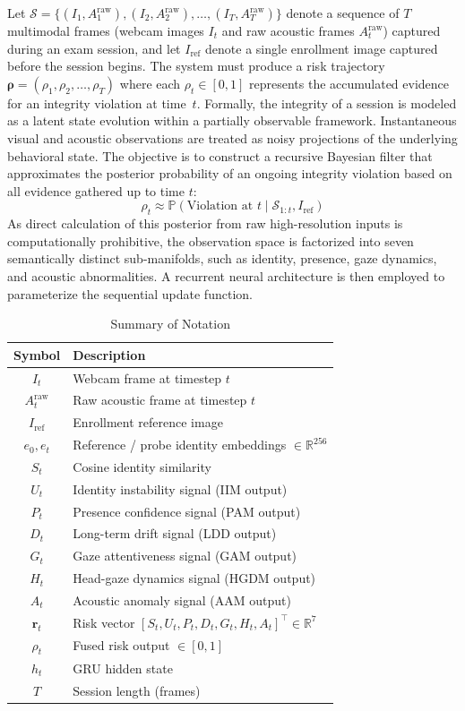 \documentclass[journal]{IEEEtran}
\begin{document}
Let $\mathcal{S} = \{(I_1, A_1^{\mathrm{raw}}), (I_2, A_2^{\mathrm{raw}}), \ldots, (I_T, A_T^{\mathrm{raw}})\}$ denote a sequence of $T$ multimodal frames (webcam images $I_t$ and raw acoustic frames $A_t^{\mathrm{raw}}$) captured during an exam session, and let $I_{\mathrm{ref}}$ denote a single enrollment image captured before the session begins. The system must produce a risk trajectory $\bm{\rho} = (\rho_1, \rho_2, \ldots, \rho_T)$ where each $\rho_t \in [0,1]$ represents the accumulated evidence for an integrity violation at time~$t$. Formally, the integrity of a session is modeled as a latent state evolution within a partially observable framework. Instantaneous visual and acoustic observations are treated as noisy projections of the underlying behavioral state. The objective is to construct a recursive Bayesian filter that approximates the posterior probability of an ongoing integrity violation based on all evidence gathered up to time $t$:
\begin{equation}
    \rho_t \approx \mathbb{P}(\text{Violation at } t \mid \mathcal{S}_{1:t}, I_{\mathrm{ref}})
\end{equation}
As direct calculation of this posterior from raw high-resolution inputs is computationally prohibitive, the observation space is factorized into seven semantically distinct sub-manifolds, such as identity, presence, gaze dynamics, and acoustic abnormalities. A recurrent neural architecture is then employed to parameterize the sequential update function.

\begin{table}[!ht]
\caption{Summary of Notation}
\label{tab:notation}
\centering
\footnotesize
\begin{tabular}{cl}
\toprule
\textbf{Symbol} & \textbf{Description} \\
\midrule
$I_t$ & Webcam frame at timestep $t$ \\
$A_t^{\mathrm{raw}}$ & Raw acoustic frame at timestep $t$ \\
$I_{\mathrm{ref}}$ & Enrollment reference image \\
$e_0, e_t$ & Reference / probe identity embeddings $\in \mathbb{R}^{256}$ \\
$S_t$ & Cosine identity similarity \\
$U_t$ & Identity instability signal (IIM output) \\
$P_t$ & Presence confidence signal (PAM output) \\
$D_t$ & Long-term drift signal (LDD output) \\
$G_t$ & Gaze attentiveness signal (GAM output) \\
$H_t$ & Head-gaze dynamics signal (HGDM output) \\
$A_t$ & Acoustic anomaly signal (AAM output) \\
$\mathbf{r}_t$ & Risk vector $[S_t, U_t, P_t, D_t, G_t, H_t, A_t]^{\!\top} \in \mathbb{R}^7$ \\
$\rho_t$ & Fused risk output $\in [0,1]$ \\
$h_t$ & GRU hidden state \\
$T$ & Session length (frames) \\
\bottomrule
\end{tabular}
\end{table}
\end{document}
